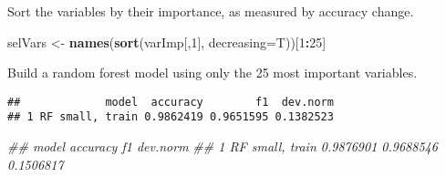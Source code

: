 \documentclass[]{article}
\newenvironment{Shaded}{\begin{snugshade}}{\end{snugshade}}
\newcommand{\CommentTok}[1]{\textcolor[rgb]{0.56,0.35,0.01}{\textit{#1}}}
\newcommand{\DataTypeTok}[1]{\textcolor[rgb]{0.13,0.29,0.53}{#1}}
\newcommand{\DecValTok}[1]{\textcolor[rgb]{0.00,0.00,0.81}{#1}}
\newcommand{\KeywordTok}[1]{\textcolor[rgb]{0.13,0.29,0.53}{\textbf{#1}}}
\newcommand{\NormalTok}[1]{#1}
\newcommand{\OperatorTok}[1]{\textcolor[rgb]{0.81,0.36,0.00}{\textbf{#1}}}
\newcommand{\StringTok}[1]{\textcolor[rgb]{0.31,0.60,0.02}{#1}}
\begin{document}
Sort the variables by their importance, as measured by accuracy change.

\begin{Shaded}
\begin{Highlighting}[]
\NormalTok{selVars <-}\StringTok{ }\KeywordTok{names}\NormalTok{(}\KeywordTok{sort}\NormalTok{(varImp[,}\DecValTok{1}\NormalTok{], }\DataTypeTok{decreasing=}\NormalTok{T))[}\DecValTok{1}\OperatorTok{:}\DecValTok{25}\NormalTok{]}
\end{Highlighting}
\end{Shaded}

Build a random forest model using only the 25 most important variables.

\begin{Shaded}
\end{Shaded}

\begin{Shaded}
\end{Shaded}

\begin{verbatim}
##             model  accuracy        f1  dev.norm
## 1 RF small, train 0.9862419 0.9651595 0.1382523
\end{verbatim}

\begin{Shaded}
\begin{Highlighting}[]
\CommentTok{## model accuracy f1 dev.norm}
\CommentTok{## 1 RF small, train 0.9876901 0.9688546 0.1506817}
\end{Highlighting}
\end{Shaded}
\end{document}
